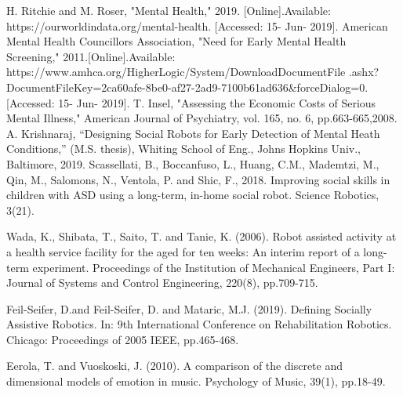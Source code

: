 \documentclass[letterpaper, 10 pt, conference]{ieeeconf}  %
\begin{document}
\begin{thebibliography}{99} %

 H. Ritchie and M. Roser, "Mental Health," 2019. [Online].Available: https://ourworldindata.org/mental-health. [Accessed: 15- Jun- 2019]. 
 American Mental Health Councillors Association, "Need for Early Mental Health Screening," 2011.[Online].Available: https://www.amhca.org/HigherLogic/System/DownloadDocumentFile .ashx?DocumentFileKey=2ca60afe-8be0-af27-2ad9-7100b61ad636&forceDialog=0. [Accessed: 15- Jun- 2019]. 
 T. Insel, "Assessing the Economic Costs of Serious Mental Illness," American Journal of Psychiatry, vol. 165, no. 6, pp.663-665,2008.
 A. Krishnaraj, “Designing Social Robots for Early Detection of Mental Heath Conditions,” (M.S. thesis), Whiting School of Eng., Johns Hopkins Univ., Baltimore, 2019.
 Scassellati, B., Boccanfuso, L., Huang, C.M., Mademtzi, M., Qin, M., Salomons, N., Ventola, P. and Shic, F., 2018. Improving social skills in children with ASD using a long-term, in-home social robot. Science Robotics, 3(21).

 Wada, K., Shibata, T., Saito, T. and Tanie, K. (2006). Robot assisted activity at a health service facility for the aged for ten weeks: An interim report of a long-term experiment. Proceedings of the Institution of Mechanical Engineers, Part I: Journal of Systems and Control Engineering, 220(8), pp.709-715.

 Feil-Seifer, D.and Feil-Seifer, D. and Mataric, M.J. (2019). Defining Socially Assistive Robotics. In: 9th International Conference on Rehabilitation Robotics. Chicago: Proceedings of 2005 IEEE, pp.465-468.

  Eerola, T. and Vuoskoski, J. (2010). A comparison of the discrete and dimensional models of emotion in music. Psychology of Music, 39(1), pp.18-49.



\end{thebibliography}
\end{document}
